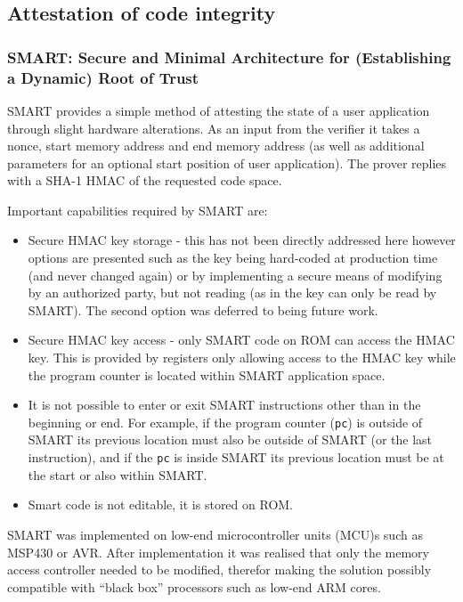 \subsection{Attestation of code integrity} \label{staticAttestationSolutions}

\subsubsection{SMART: Secure and Minimal Architecture for (Establishing a Dynamic) Root of Trust}
SMART \cite{For} provides a simple method of attesting the state of a user application through slight hardware alterations. As an input from the verifier it takes a nonce, start memory address and end memory address (as well as additional parameters for an optional start position of user application). The prover replies with a SHA-1 HMAC of the requested code space.

Important capabilities required by SMART are:
\begin{itemize}
	\item Secure HMAC key storage - this has not been directly addressed here however options are presented such as the key being hard-coded at production time (and never changed again) or by implementing a secure means of modifying by an authorized party, but not reading (as in the key can only be read by SMART). The second option was deferred to being future work.
	\item Secure HMAC key access - only SMART code on ROM can access the HMAC key. This is provided by registers only allowing access to the HMAC key while the program counter is located within SMART application space.
	\item It is not possible to enter or exit SMART instructions other than in the beginning or end. For example, if the program counter (\verb|pc|) is outside of SMART its previous location must also be outside of SMART (or the last instruction), and if the \verb|pc| is inside SMART its previous location must be at the start or also within SMART.
	\item Smart code is not editable, it is stored on ROM.
\end{itemize}

SMART was implemented on low-end microcontroller units (MCU)s such as MSP430 or AVR. After implementation it was realised that only the memory access controller needed to be modified, therefor making the solution possibly compatible with “black box” processors such as low-end ARM cores.

